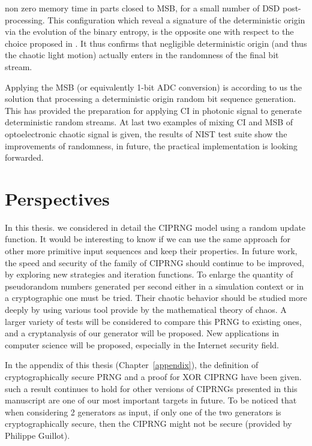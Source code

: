 non zero memory time in parts closed to MSB, for a small number of DSD post-processing. This configuration which reveal a signature of the deterministic origin via the evolution of the binary entropy, is the opposite one with respect to the choice proposed in \cite{ultrafast2009, ultrafast2010}. It thus confirms that negligible deterministic origin (and thus the chaotic light motion) actually enters in the randomness of the final bit stream.

Applying the MSB (or equivalently 1-bit ADC conversion) is according to us the solution that processing a deterministic origin random bit sequence generation. This has provided the preparation for applying CI in photonic signal to generate deterministic random streams. At last two examples of mixing CI and MSB of optoelectronic chaotic signal is given, the results of NIST test suite show the improvements of randomness, in future, the practical implementation is looking forwarded. 


\section{Perspectives}
In this thesis. we considered in detail the CIPRNG model using a random update function. It
would be interesting to know if we can use the same approach for other more primitive input sequences and keep their properties. In future work, the speed and security of the family of CIPRNG should continue to be improved, by exploring new strategies and iteration functions. To enlarge the quantity of pseudorandom numbers generated per second either in a simulation context or in a cryptographic one must be tried. Their chaotic behavior should be studied more deeply by using various tool provide by the mathematical theory of chaos. A larger variety of tests will be considered to compare this
PRNG to existing ones, and a cryptanalysis of our generator will be proposed. New applications in computer
science will be proposed, especially in the Internet security field. 

In the appendix of this thesis (Chapter~\ref{appendix}), the definition of cryptographically secure PRNG and a proof for XOR CIPRNG have been given. such a result continues to hold for other versions of CIPRNGs presented in this manuscript are one of our most important targets in future. To be noticed that when considering 2 generators as input, if only one of the two generators is cryptographically secure, then the CIPRNG might not be secure (provided by Philippe Guillot).

